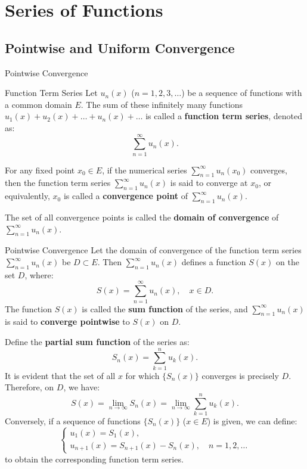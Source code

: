 \documentclass[11pt]{../../TexTemplate/elegantbook}
\begin{document}
\chapter{Series of Functions}
\section{Pointwise and Uniform Convergence}
\begin{leftbarTitle}{Pointwise Convergence}\end{leftbarTitle}
\begin{definition}{Function Term Series}
    Let \( u_n(x) \) (\( n = 1, 2, 3, \dots \)) be a sequence of functions with a common domain \( E \). 
    The sum of these infinitely many functions \( u_1(x) + u_2(x) + \dots + u_n(x) + \dots \) 
    is called a \textbf{function term series}, denoted as:
    \[
    \sum_{n=1}^{\infty} u_n(x).
    \]

    For any fixed point \( x_0 \in E \), if the numerical series \( \sum_{n=1}^{\infty} u_n(x_0) \) converges, 
    then the function term series \( \sum_{n=1}^{\infty} u_n(x) \) is said to 
    converge at \( x_0 \), or equivalently, \( x_0 \) is called 
    a \textbf{convergence point} of \( \sum_{n=1}^{\infty} u_n(x) \).

    The set of all convergence points is called the \textbf{domain of convergence} of \( \sum_{n=1}^{\infty} u_n(x) \).
\end{definition}

\begin{definition}{Pointwise Convergence}
    Let the domain of convergence of the function term series \( \sum_{n=1}^\infty u_n(x) \) be \( D \subset E \). 
    Then \( \sum_{n=1}^\infty u_n(x) \) defines a function \( S(x) \) on the set \( D \), where:
    \[
    S(x) = \sum_{n=1}^\infty u_n(x), \quad x \in D.
    \]
    The function \( S(x) \) is called the \textbf{sum function} of the series, 
    and \( \sum_{n=1}^\infty u_n(x) \) is said to \textbf{converge pointwise} to \( S(x) \) on \( D \).
\end{definition}

Define the \textbf{partial sum function} of the series as:
\[
S_n(x) = \sum_{k=1}^n u_k(x).
\]
It is evident that the set of all \( x \) for which \( \{ S_n(x) \} \) converges is precisely \( D \). 
Therefore, on \( D \), we have:
\[
S(x) = \lim_{n \to \infty} S_n(x) = \lim_{n \to \infty} \sum_{k=1}^n u_k(x).
\]
Conversely, if a sequence of functions \( \{ S_n(x) \} \) (\( x \in E \)) is given, we can define:
\[
\begin{cases}
u_1(x) = S_1(x), \\
u_{n+1}(x) = S_{n+1}(x) - S_n(x), \quad n = 1, 2, \dots
\end{cases}
\]
to obtain the corresponding function term series.
\end{document}
